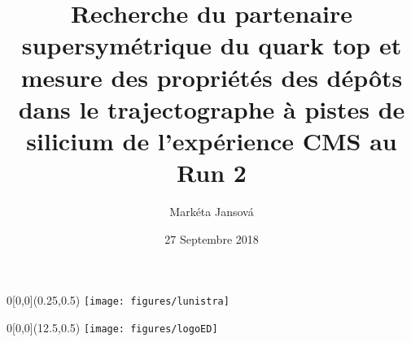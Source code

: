 
\title{Recherche du partenaire supersymétrique du quark top et mesure des propriétés des dépôts dans le trajectographe à pistes de silicium de l’expérience CMS au Run 2}
\author{Mark\'{e}ta Jansov\'{a}}
\date{27 Septembre 2018}


\begin{textblock}{0}[0,0](0.25,0.5)
{
    \setlength{\fboxsep}{0.7pt}
    \setlength{\fboxrule}{1pt}
    \texttt{[image: figures/lunistra]}
}
\end{textblock}

\begin{textblock}{0}[0,0](12.5,0.5)
{
    \setlength{\fboxsep}{0.7pt}
    \setlength{\fboxrule}{1pt}
    \texttt{[image: figures/logoED]}
}
\end{textblock}

